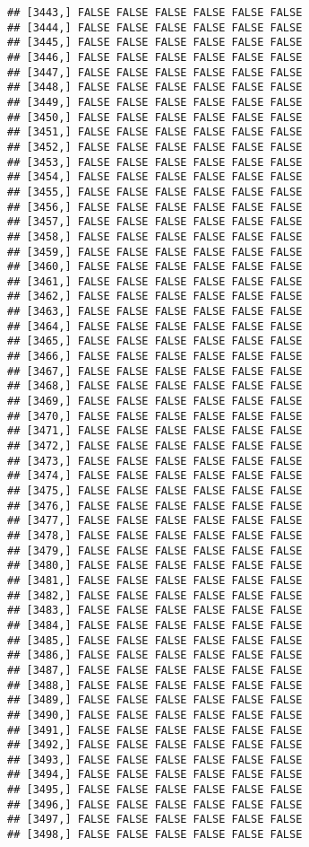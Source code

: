 \documentclass[
]{article}
\begin{document}
\begin{verbatim}
## [3443,] FALSE FALSE FALSE FALSE FALSE FALSE
## [3444,] FALSE FALSE FALSE FALSE FALSE FALSE
## [3445,] FALSE FALSE FALSE FALSE FALSE FALSE
## [3446,] FALSE FALSE FALSE FALSE FALSE FALSE
## [3447,] FALSE FALSE FALSE FALSE FALSE FALSE
## [3448,] FALSE FALSE FALSE FALSE FALSE FALSE
## [3449,] FALSE FALSE FALSE FALSE FALSE FALSE
## [3450,] FALSE FALSE FALSE FALSE FALSE FALSE
## [3451,] FALSE FALSE FALSE FALSE FALSE FALSE
## [3452,] FALSE FALSE FALSE FALSE FALSE FALSE
## [3453,] FALSE FALSE FALSE FALSE FALSE FALSE
## [3454,] FALSE FALSE FALSE FALSE FALSE FALSE
## [3455,] FALSE FALSE FALSE FALSE FALSE FALSE
## [3456,] FALSE FALSE FALSE FALSE FALSE FALSE
## [3457,] FALSE FALSE FALSE FALSE FALSE FALSE
## [3458,] FALSE FALSE FALSE FALSE FALSE FALSE
## [3459,] FALSE FALSE FALSE FALSE FALSE FALSE
## [3460,] FALSE FALSE FALSE FALSE FALSE FALSE
## [3461,] FALSE FALSE FALSE FALSE FALSE FALSE
## [3462,] FALSE FALSE FALSE FALSE FALSE FALSE
## [3463,] FALSE FALSE FALSE FALSE FALSE FALSE
## [3464,] FALSE FALSE FALSE FALSE FALSE FALSE
## [3465,] FALSE FALSE FALSE FALSE FALSE FALSE
## [3466,] FALSE FALSE FALSE FALSE FALSE FALSE
## [3467,] FALSE FALSE FALSE FALSE FALSE FALSE
## [3468,] FALSE FALSE FALSE FALSE FALSE FALSE
## [3469,] FALSE FALSE FALSE FALSE FALSE FALSE
## [3470,] FALSE FALSE FALSE FALSE FALSE FALSE
## [3471,] FALSE FALSE FALSE FALSE FALSE FALSE
## [3472,] FALSE FALSE FALSE FALSE FALSE FALSE
## [3473,] FALSE FALSE FALSE FALSE FALSE FALSE
## [3474,] FALSE FALSE FALSE FALSE FALSE FALSE
## [3475,] FALSE FALSE FALSE FALSE FALSE FALSE
## [3476,] FALSE FALSE FALSE FALSE FALSE FALSE
## [3477,] FALSE FALSE FALSE FALSE FALSE FALSE
## [3478,] FALSE FALSE FALSE FALSE FALSE FALSE
## [3479,] FALSE FALSE FALSE FALSE FALSE FALSE
## [3480,] FALSE FALSE FALSE FALSE FALSE FALSE
## [3481,] FALSE FALSE FALSE FALSE FALSE FALSE
## [3482,] FALSE FALSE FALSE FALSE FALSE FALSE
## [3483,] FALSE FALSE FALSE FALSE FALSE FALSE
## [3484,] FALSE FALSE FALSE FALSE FALSE FALSE
## [3485,] FALSE FALSE FALSE FALSE FALSE FALSE
## [3486,] FALSE FALSE FALSE FALSE FALSE FALSE
## [3487,] FALSE FALSE FALSE FALSE FALSE FALSE
## [3488,] FALSE FALSE FALSE FALSE FALSE FALSE
## [3489,] FALSE FALSE FALSE FALSE FALSE FALSE
## [3490,] FALSE FALSE FALSE FALSE FALSE FALSE
## [3491,] FALSE FALSE FALSE FALSE FALSE FALSE
## [3492,] FALSE FALSE FALSE FALSE FALSE FALSE
## [3493,] FALSE FALSE FALSE FALSE FALSE FALSE
## [3494,] FALSE FALSE FALSE FALSE FALSE FALSE
## [3495,] FALSE FALSE FALSE FALSE FALSE FALSE
## [3496,] FALSE FALSE FALSE FALSE FALSE FALSE
## [3497,] FALSE FALSE FALSE FALSE FALSE FALSE
## [3498,] FALSE FALSE FALSE FALSE FALSE FALSE

\end{verbatim}
\end{document}
